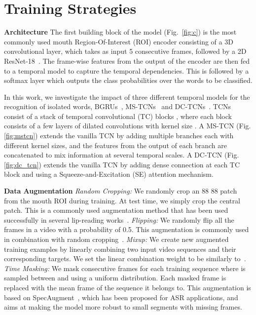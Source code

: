 \documentclass{article}
\begin{document}
\section{Training Strategies }
\noindent\textbf{Architecture}\quad
The first building block of the model (Fig.~\ref{fig:c}) is the most commonly used mouth Region-Of-Interest (ROI) encoder consisting of a 3D convolutional layer, which takes as input 5 consecutive frames, followed by a 2D ResNet-18~\cite{stafylakis2017combining}. The frame-wise features from the output of the encoder are then fed to a temporal model to capture the temporal dependencies. This is followed by a softmax layer which outputs the class probabilities over the words to be classified.

In this work, we investigate the impact of three different temporal models for the recognition of isolated words, BGRUs~\cite{petridis2018end}, MS-TCNs~\cite{martinez2020lipreading} and DC-TCNs~\cite{ma2021lip}.  TCNs consist of a stack of temporal convolutional (TC) blocks , where each block consists of a few layers of dilated convolutions with kernel size . A MS-TCN (Fig. \ref{fig:mstcn}) extends the vanilla TCN by adding multiple branches each with different kernel sizes, and the features from the output of each branch are concatenated to mix information at several temporal scales. A DC-TCN (Fig. \ref{fig:dc_tcn}) extends the vanilla TCN by adding dense connection at each TC block and using a Squeeze-and-Excitation (SE) attention mechanism.

\noindent\textbf{Data Augmentation}\label{ssec:DataAugm}\quad
\textit{Random Cropping:} We randomly crop an 88  88 patch from the mouth ROI during training. At test time, we simply crop the central patch. This is a commonly used augmentation method that has been used successfully in several lip-reading works~\cite{martinez2020lipreading, petridis2018end}.    
\textit{Flipping:} We randomly flip all the frames in a video with a probability of 0.5. This augmentation is commonly used in combination with random cropping~\cite{martinez2020lipreading, petridis2018end}.  
\textit{Mixup:} We create new augmented training examples by linearly combining two input video sequences  and their corresponding targets. 
We set the linear combination weight  to be  similarly to~\cite{ma2020towards}.
\textit{Time Masking:} We mask  consecutive frames for each training sequence where  is sampled between  and  using a uniform distribution. Each masked frame is replaced with the mean frame of the sequence it belongs to. This augmentation is based on SpecAugment~\cite{DBLP:conf/interspeech/ParkCZCZCL19}, which has been proposed for ASR applications, and aims at making the model more robust to small segments with missing frames.  
\end{document}
